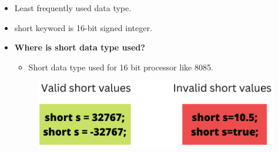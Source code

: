 

\begin{flushleft}
	\begin{itemize}
		\item Least frequently used data type.
		\item short keyword is 16-bit signed integer. 
		
		\bigskip
		\item \textbf{Where is short data type used?}
		\begin{itemize}
			\item Short data type used for 16 bit processor like 8085.
		\end{itemize}	
	
		\begin{figure}[h!]
			\centering
			\includegraphics[scale=.38]{content/chapter2/images/short.png}
		\end{figure}		
	\end{itemize}
	
\end{flushleft}

